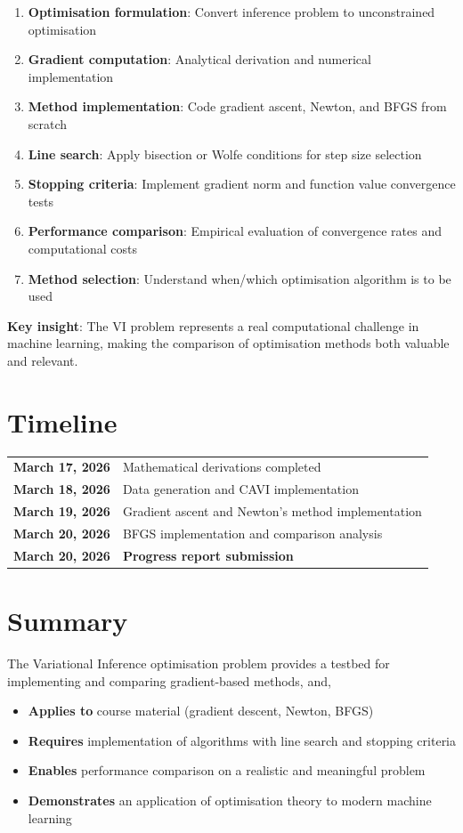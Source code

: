 \documentclass[11pt]{article}
\begin{document}
\begin{enumerate}[leftmargin=*]
\item \textbf{Optimisation formulation}: Convert inference problem to unconstrained optimisation
\item \textbf{Gradient computation}: Analytical derivation and numerical implementation
\item \textbf{Method implementation}: Code gradient ascent, Newton, and BFGS from scratch
\item \textbf{Line search}: Apply bisection or Wolfe conditions for step size selection
\item \textbf{Stopping criteria}: Implement gradient norm and function value convergence tests
\item \textbf{Performance comparison}: Empirical evaluation of convergence rates and computational costs
\item \textbf{Method selection}: Understand when/which  optimisation algorithm is to be used
\end{enumerate}

\textbf{Key insight}: The VI problem represents a real computational challenge in machine learning, making the comparison of optimisation methods both  valuable and  relevant.

\section*{Timeline}

\begin{tabular}{ll}
\textbf{March 17, 2026} & Mathematical derivations completed \\
\textbf{March 18, 2026} & Data generation and CAVI implementation \\
\textbf{March 19, 2026} & Gradient ascent and Newton's method implementation \\
\textbf{March 20, 2026} & BFGS implementation and comparison analysis \\
\textbf{March 20, 2026} & \textbf{Progress report submission} \\
\end{tabular}

\section*{Summary}

The Variational Inference optimisation problem provides a testbed for implementing and comparing gradient-based methods, and, 

\begin{itemize}
\item \textbf{Applies to } course material (gradient descent, Newton, BFGS)
\item \textbf{Requires}  implementation of algorithms with line search and stopping criteria
\item \textbf{Enables}  performance comparison on a realistic and meaningful problem
\item \textbf{Demonstrates} an application of optimisation theory to modern machine learning
\end{itemize}
\end{document}
